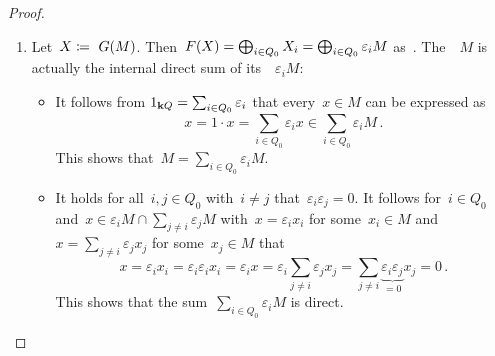\begin{proof}
  \leavevmode
  \begin{enumerate}
    \item
      Let~$X \coloneqq\ G(M)$.
      Then~$F(X) = \bigoplus_{i \in Q_0} X_i = \bigoplus_{i \in Q_0} \varepsilon_i M$ as~{\modules{$\kf$}}.
      The~{}~$M$ is actually the internal direct sum of its~{\submodules{$\kf$}}~$\varepsilon_i M$:
      \begin{itemize}
        \item
          It follows from $1_{\mathbf{k} Q} = \sum_{i \in Q_0} \varepsilon_i$ that every~$x \in M$ can be expressed as
          \[
                x
            =   1 \cdot x
            =   \sum_{i \in Q_0} \varepsilon_i x
            \in \sum_{i \in Q_0} \varepsilon_i M \,.
          \]
          This shows that~$M = \sum_{i \in Q_0} \varepsilon_i M$.
        \item
          It holds for all~$i, j \in Q_0$ with~$i \neq j$ that~$\varepsilon_i \varepsilon_j = 0$.
          It follows for~$i \in Q_0$ and~$x \in \varepsilon_i M \cap \sum_{j \neq i} \varepsilon_j M$ with~$x = \varepsilon_i x_i$ for some~$x_i \in M$ and~$x = \sum_{j \neq i} \varepsilon_j x_j$ for some~$x_j \in M$ that
          \[
              x
            = \varepsilon_i x_i
            = \varepsilon_i \varepsilon_i x_i
            = \varepsilon_i x
            = \varepsilon_i \sum_{j \neq i} \varepsilon_j x_j
            = \sum_{j \neq i} \underbrace{\varepsilon_i \varepsilon_j}_{=0} x_j
            = 0 \,.
          \]
          This shows that the sum~$\sum_{i \in Q_0} \varepsilon_i M$ is direct.
      \end{itemize}
      

\end{enumerate}
\end{proof}
